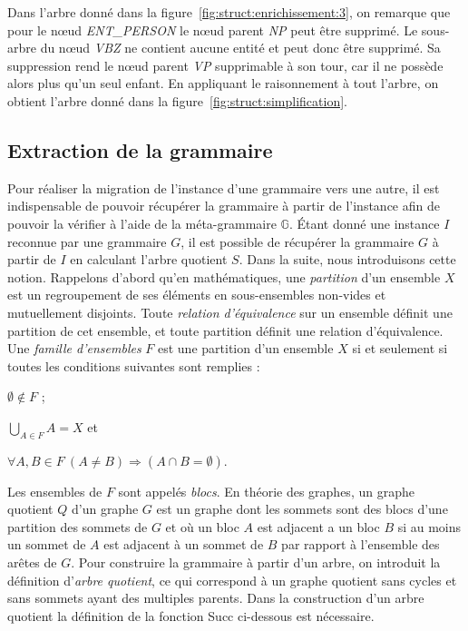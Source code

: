 \begin{example}
    Dans l'arbre donné dans la figure~\ref{fig:struct:enrichissement:3}, on remarque que pour le nœud \emph{ENT\_PERSON} le nœud parent \emph{NP} peut être supprimé.
    Le sous-arbre du nœud \emph{VBZ} ne contient aucune entité et peut donc être supprimé.
    Sa suppression rend le nœud parent \emph{VP} supprimable à son tour, car il ne possède alors plus qu'un seul enfant.
    En appliquant le raisonnement à tout l'arbre, on obtient l'arbre donné dans la figure~\ref{fig:struct:simplification}.
\end{example}

\subsection{Extraction de la grammaire}
Pour réaliser la migration de l'instance d'une grammaire vers une autre, il est indispensable de pouvoir récupérer la grammaire à partir de l'instance afin de pouvoir la vérifier à l'aide de la méta-grammaire $\mathbb{G}$.
Étant donné une instance $I$ reconnue par une grammaire $G$, il est possible de récupérer la grammaire $G$ à partir de $I$ en calculant l'arbre quotient $S$.
Dans la suite, nous introduisons cette notion.
Rappelons d'abord qu'en mathématiques, une \emph{partition} d'un ensemble $X$ est un regroupement de ses éléments en sous-ensembles non-vides et mutuellement disjoints.
Toute \emph{relation d'équivalence} sur un ensemble définit une partition de cet ensemble, et toute partition définit une relation d'équivalence.
Une \emph{famille d'ensembles} $F$ est une partition d'un ensemble $X$ si et seulement si toutes les conditions suivantes sont remplies :
\begin{enumerate*}[label=(\roman*)]
    \item $\emptyset \not\in F$ ;
    \item $\bigcup_{A \in F}A = X$ et
    \item $\forall A, B  \in F~ (A \neq B) \Rightarrow ( A \cap B = \emptyset)$.
\end{enumerate*}
Les ensembles de $F$ sont appelés \textit{blocs}.
En théorie des graphes, un graphe quotient $Q$ d'un graphe $G$ est un graphe dont les sommets sont des blocs d'une partition des sommets de $G$ et où un bloc $A$ est adjacent a un bloc $B$ si au moins un sommet de $A$ est adjacent à un sommet de $B$ par rapport à l'ensemble des arêtes de $G$.
Pour construire la grammaire à partir d'un arbre, on introduit la définition d'\textit{arbre quotient}, ce qui correspond à un graphe quotient sans cycles et sans sommets ayant des multiples parents.
Dans la construction d'un arbre quotient la définition de la fonction \textsf{Succ} ci-dessous est nécessaire.

